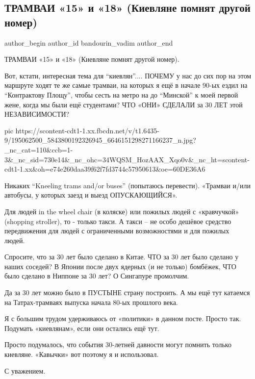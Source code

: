  
 
 
 
 
 
\subsection{ТРАМВАИ «15» и «18» (Киевляне помнят другой номер)}
\label{sec:03_06_2021.fb.bandourin_vadim.1.tramvaj_kiev_30_let}
\ifcmt
 author_begin
   author_id bandourin_vadim
 author_end
\fi

ТРАМВАИ «15» и «18» (Киевляне помнят другой номер).

Вот, кстати, интересная тема для \enquote{киевлян}.... ПОЧЕМУ у нас до сих пор на этом
маршруте ходят те же самые трамваи, на которых я ещё в начале 90-ых ездил на
\enquote{Контрактову Площу}, чтобы сесть на метро на до \enquote{Минской} к моей первой жене,
когда мы были ещё студентами? ЧТО «ОНИ» СДЕЛАЛИ за 30 ЛЕТ этой НЕЗАВИСИМОСТИ? 

\ifcmt
  pic https://scontent-cdt1-1.xx.fbcdn.net/v/t1.6435-9/195062500_5843800192326945_6646151298271166237_n.jpg?_nc_cat=110&ccb=1-3&_nc_sid=730e14&_nc_ohc=34WQSM_HozAAX_Xqo0v&_nc_ht=scontent-cdt1-1.xx&oh=e74e260daa39f62f7fd3744c57950613&oe=60DE36A6
\fi

Никаких \enquote{Kneeling trams and/or buses} (попытаюсь перевести). «Трамваи и/или автобусы, у которых заезд и выезд ОПУСКАЮЩИЙСЯ».  

Для людей in the wheel chair (в коляске) или пожилых людей с «кравчучкой»
(shopping stroller), то - только такси. А такси – не особо дешёвое средство
передвижения для людей с ограниченными возможностями и для пожилых людей. 

Спросите, что за 30 лет было сделано в Китае. ЧТО за 30 лет было сделано у
наших соседей? В Японии после двух ядерных (и не только) бомбёжек, ЧТО было
сделано в Ниппоне за 30 лет? О Сингапуре промолчим.

Да за 30 лет можно было в ПУСТЫНЕ страну построить. А мы ещё тут катаемся на
Татрах-трамваях выпуска начала 80-ых прошлого века.

Я с большим трудом удерживаюсь от «политики» в данном посте. Просто так.
Подумать «киевлянам», если они остались ещё тут.

Просто подумалось, что события 30-летней давности могут помнить только
киевляне. «Кавычки» вот поэтому я и использовал.

С уважением.
